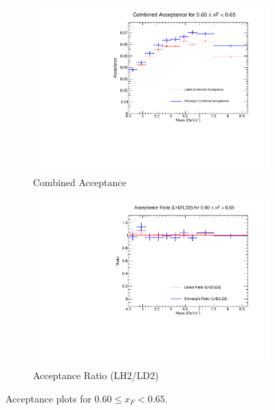 \documentclass[11pt]{article}
\begin{document}
\begin{figure}[p]
\begin{subfigure}[b]{0.48\textwidth}
       \includegraphics[width=\linewidth]{./acceptancePlots/Combined_acceptance_xF_bin_12.pdf}
       \caption{Combined Acceptance}
    \end{subfigure}\hfill
    \begin{subfigure}[b]{0.48\textwidth}
       \includegraphics[width=\linewidth]{./acceptancePlots/Acceptance_ratio_xF_bin_12.pdf}
       \caption{Acceptance Ratio (LH2/LD2)}
    \end{subfigure}
    \caption{Acceptance plots for $0.60 \le x_F < 0.65$.}
\end{figure}
\end{document}

